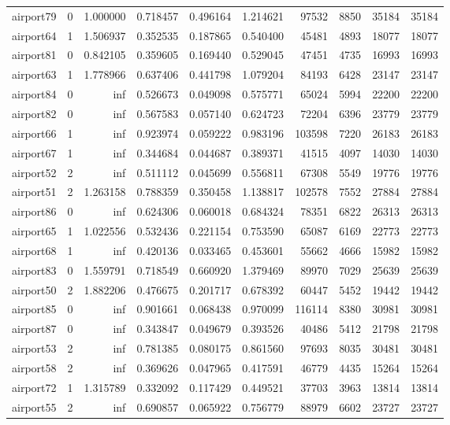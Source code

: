 \begin{longtable}{|l|r|r|r|r|r|r|r|r|r|}
airport79 & 0 & 1.000000 & 0.718457 & 0.496164 & 1.214621 & 97532 & 8850 & 35184 & 35184 \\
airport64 & 1 & 1.506937 & 0.352535 & 0.187865 & 0.540400 & 45481 & 4893 & 18077 & 18077 \\
airport81 & 0 & 0.842105 & 0.359605 & 0.169440 & 0.529045 & 47451 & 4735 & 16993 & 16993 \\
airport63 & 1 & 1.778966 & 0.637406 & 0.441798 & 1.079204 & 84193 & 6428 & 23147 & 23147 \\
airport84 & 0 & inf & 0.526673 & 0.049098 & 0.575771 & 65024 & 5994 & 22200 & 22200 \\
airport82 & 0 & inf & 0.567583 & 0.057140 & 0.624723 & 72204 & 6396 & 23779 & 23779 \\
airport66 & 1 & inf & 0.923974 & 0.059222 & 0.983196 & 103598 & 7220 & 26183 & 26183 \\
airport67 & 1 & inf & 0.344684 & 0.044687 & 0.389371 & 41515 & 4097 & 14030 & 14030 \\
airport52 & 2 & inf & 0.511112 & 0.045699 & 0.556811 & 67308 & 5549 & 19776 & 19776 \\
airport51 & 2 & 1.263158 & 0.788359 & 0.350458 & 1.138817 & 102578 & 7552 & 27884 & 27884 \\
airport86 & 0 & inf & 0.624306 & 0.060018 & 0.684324 & 78351 & 6822 & 26313 & 26313 \\
airport65 & 1 & 1.022556 & 0.532436 & 0.221154 & 0.753590 & 65087 & 6169 & 22773 & 22773 \\
airport68 & 1 & inf & 0.420136 & 0.033465 & 0.453601 & 55662 & 4666 & 15982 & 15982 \\
airport83 & 0 & 1.559791 & 0.718549 & 0.660920 & 1.379469 & 89970 & 7029 & 25639 & 25639 \\
airport50 & 2 & 1.882206 & 0.476675 & 0.201717 & 0.678392 & 60447 & 5452 & 19442 & 19442 \\
airport85 & 0 & inf & 0.901661 & 0.068438 & 0.970099 & 116114 & 8380 & 30981 & 30981 \\
airport87 & 0 & inf & 0.343847 & 0.049679 & 0.393526 & 40486 & 5412 & 21798 & 21798 \\
airport53 & 2 & inf & 0.781385 & 0.080175 & 0.861560 & 97693 & 8035 & 30481 & 30481 \\
airport58 & 2 & inf & 0.369626 & 0.047965 & 0.417591 & 46779 & 4435 & 15264 & 15264 \\
airport72 & 1 & 1.315789 & 0.332092 & 0.117429 & 0.449521 & 37703 & 3963 & 13814 & 13814 \\
airport55 & 2 & inf & 0.690857 & 0.065922 & 0.756779 & 88979 & 6602 & 23727 & 23727 \\

\end{longtable}
